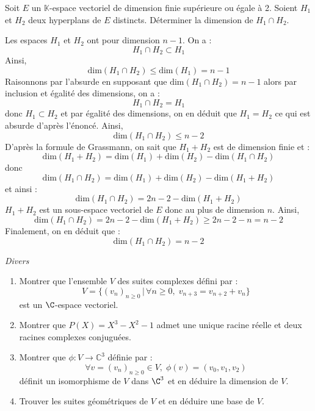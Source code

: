 \documentclass[a4paper,10pt]{report}
\begin{document}
\medskip



\begin{Exercice}{} Soit $E$ un $\mathbb{K}$-espace vectoriel de dimension finie supérieure ou égale à 2. Soient $H_1$ et $H_2$ deux hyperplans de $E$ distincts. Déterminer la dimension de $H_1 \cap H_2$.
\end{Exercice}

\corr Les espaces $H_1$ et $H_2$ ont pour dimension $n-1$. On a :
$$ H_1 \cap H_2 \subset H_1$$
Ainsi, 
$$ \textrm{dim}(H_1 \cap H_2) \leq  \textrm{dim}(H_1) = n-1$$
Raisonnons par l'absurde en supposant que $\textrm{dim}(H_1 \cap H_2) = n-1$ alors par inclusion et égalité des dimensions, on a :
$$ H_1 \cap H_2 = H_1$$
donc $H_1 \subset H_2$ et par égalité des dimensions, on en déduit que $H_1 = H_2$ ce qui est absurde d'après l'énoncé. Ainsi,
$$  \textrm{dim}(H_1 \cap H_2) \leq n-2$$
D'après la formule de Grassmann, on sait que $H_1+H_2$ est de dimension finie et :
$$  \textrm{dim}(H_1 + H_2) =  \textrm{dim}(H_1)  +  \textrm{dim}(H_2) -  \textrm{dim}(H_1 \cap H_2) $$
donc 
$$  \textrm{dim}(H_1 \cap H_2) =  \textrm{dim}(H_1)  +  \textrm{dim}(H_2) -  \textrm{dim}(H_1 + H_2) $$
et ainsi :
$$\textrm{dim}(H_1 \cap H_2) =  2n-2 -  \textrm{dim}(H_1 + H_2) $$
$H_1+H_2$ est un sous-espace vectoriel de $E$ donc au plus de dimension $n$. Ainsi,
$$\textrm{dim}(H_1 \cap H_2) =  2n-2 -  \textrm{dim}(H_1 + H_2) \geq 2n-2-n = n-2$$
Finalement, on en déduit que :
$$ \textrm{dim}(H_1 \cap H_2) =  n-2 $$


\medskip

\begin{center}
\textit{{ {\large Divers}}}
\end{center}

\medskip

\begin{Exercice}{} \begin{enumerate}
 \item Montrer que l'ensemble $V$ des suites complexes défini par :
 $$ V = \lbrace (v_n)_{n \geq 0} \, \vert \, \forall n \geq 0, \; v_{n+3}=v_{n+2}+v_n \rbrace$$
est un $\C$-espace vectoriel.
 \item Montrer que $P(X)=X^3-X^2-1$ admet une unique racine réelle et deux racines complexes conjuguées.
 \item Montrer que $\phi : V \rightarrow \mathbb{C}^3$ définie par :
 $$ \forall v=(v_n)_{n \geq 0} \in V, \;\phi(v)=(v_0,v_1,v_2)$$
  définit un isomorphisme de $V$ dans $\C^3$ et en déduire la dimension de $V$.
 \item Trouver les suites géométriques de $V$ et en déduire une base de $V$.
\end{enumerate}
\end{Exercice}
\end{document}
